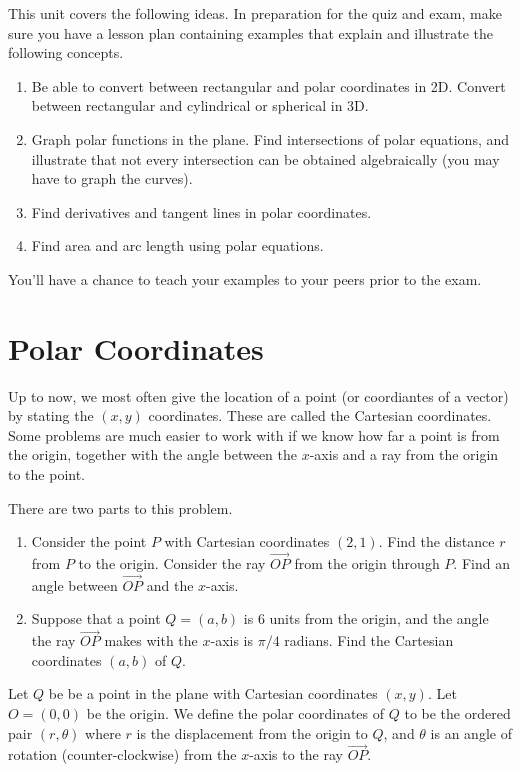 
\noindent 
This unit covers the following ideas. In preparation for the quiz and exam, make sure you have a lesson plan containing examples that explain and illustrate the following concepts.  
\begin{enumerate}

\item Be able to convert between rectangular and polar coordinates in 2D. Convert between rectangular and cylindrical or spherical in 3D.
\item Graph polar functions in the plane. Find intersections of polar equations, and illustrate that not every intersection can be obtained algebraically (you may have to graph the curves).
\item Find derivatives and tangent lines in polar coordinates.
\item Find area and arc length using polar equations.

\end{enumerate}
You'll have a chance to teach your examples to your peers prior to the exam.

\section{Polar Coordinates}
Up to now, we most often give the location of a point (or coordiantes of a vector) by stating the $(x,y)$ coordinates.  These are called the Cartesian coordinates.  Some problems are much easier to work with if we know how far a point is from the origin, together with the angle between the $x$-axis and a ray from the origin to the point.

\begin{problem}
There are two parts to this problem.
\begin{enumerate}
\item Consider the point $P$ with Cartesian coordinates $(2,1)$.  Find the distance $r$ from $P$ to the origin. Consider the ray $\vec {OP}$ from the origin through $P$. Find an angle between $\vec{OP}$ and the $x$-axis. 

\item Suppose that a point $Q=(a,b)$ is 6 units from the origin, and the angle the ray $\vec {OP}$ makes with the $x$-axis is $\pi/4$ radians.  Find the Cartesian coordinates $(a,b)$ of $Q$.
\end{enumerate}

 
\end{problem}

\begin{definition}
Let $Q$ be be a point in the plane with Cartesian coordinates $(x,y)$.  Let $O=(0,0)$ be the origin. We define the polar coordinates of $Q$ to be the ordered pair $(r,\theta)$ where $r$ is the displacement from the origin to $Q$, and $\theta$ is an angle of rotation (counter-clockwise) from the $x$-axis to the ray $\vec {OP}$.
\end{definition}


